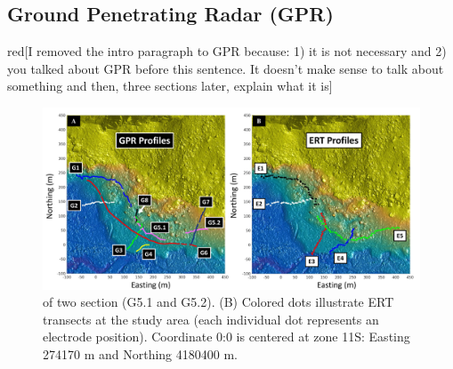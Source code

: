 \documentclass[5p]{elsarticle}
\newcommand{\COMON}{\begin{color}{blue}}
\newcommand{\COMOFF}{\end{color}}
\newcommand{\alon}{\begin{color}{red}}
\newcommand{\aloff}{\end{color}}
\begin{document}
	\subsection{Ground Penetrating Radar (GPR)}
										
        \alon[I removed the intro paragraph to GPR because: 1) it is not necessary and 2) you talked about GPR before this sentence. It doesn't make sense to talk about something and then, three sections later, explain what it is]\aloff




											\begin{figure}[h]

	\includegraphics[width=\textwidth]{Figures/GPR_ERT_Map.pdf}
		\caption{of two section (G5.1 and G5.2). (B) Colored dots illustrate ERT transects at the study area (each individual dot represents an electrode position). Coordinate 0:0 is centered at zone 11S: Easting 274170 m and Northing 4180400 m.  \label{GPR profile 7}}

											\end{figure}										
											
\end{document}
